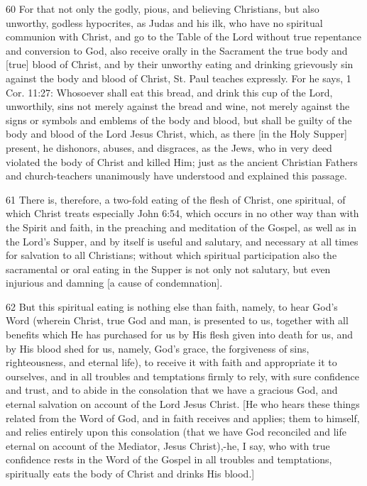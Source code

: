 60 For that not only the godly, pious, and believing Christians, but also unworthy, godless hypocrites, as Judas and his ilk, who have no spiritual communion with Christ, and go to the Table of the Lord without true repentance and conversion to God, also receive orally in the Sacrament the true body and [true] blood of Christ, and by their unworthy eating and drinking grievously sin against the body and blood of Christ, St. Paul teaches expressly. For he says, 1 Cor. 11:27: Whosoever shall eat this bread, and drink this cup of the Lord, unworthily, sins not merely against the bread and wine, not merely against the signs or symbols and emblems of the body and blood, but shall be guilty of the body and blood of the Lord Jesus Christ, which, as there [in the Holy Supper] present, he dishonors, abuses, and disgraces, as the Jews, who in very deed violated the body of Christ and killed Him; just as the ancient Christian Fathers and church-teachers unanimously have understood and explained this passage.

61 There is, therefore, a two-fold eating of the flesh of Christ, one spiritual, of which Christ treats especially John 6:54, which occurs in no other way than with the Spirit and faith, in the preaching and meditation of the Gospel, as well as in the Lord’s Supper, and by itself is useful and salutary, and necessary at all times for salvation to all Christians; without which spiritual participation also the sacramental or oral eating in the Supper is not only not salutary, but even injurious and damning [a cause of condemnation].

62 But this spiritual eating is nothing else than faith, namely, to hear God’s Word (wherein Christ, true God and man, is presented to us, together with all benefits which He has purchased for us by His flesh given into death for us, and by His blood shed for us, namely, God’s grace, the forgiveness of sins, righteousness, and eternal life), to receive it with faith and appropriate it to ourselves, and in all troubles and temptations firmly to rely, with sure confidence and trust, and to abide in the consolation that we have a gracious God, and eternal salvation on account of the Lord Jesus Christ. [He who hears these things related from the Word of God, and in faith receives and applies; them to himself, and relies entirely upon this consolation (that we have God reconciled and life eternal on account of the Mediator, Jesus Christ),-he, I say, who with true confidence rests in the Word of the Gospel in all troubles and temptations, spiritually eats the body of Christ and drinks His blood.]

